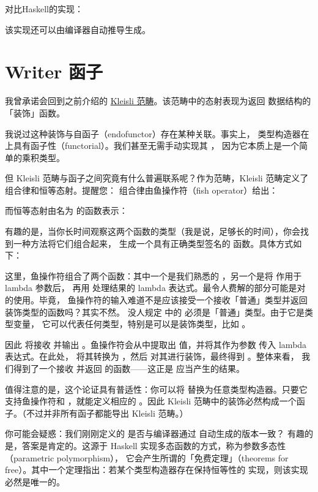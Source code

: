 对比Haskell的实现：

该实现还可以由编译器自动推导生成。

\section{Writer 函子}

我曾承诺会回到之前介绍的 \hyperref[kleisli-categories]{Kleisli
  范畴}。该范畴中的态射表现为返回 
数据结构的「装饰」函数。

我说过这种装饰与自函子（endofunctor）存在某种关联。事实上，
 类型构造器在  上具有函子性（functorial）。我们甚至无需手动实现其 ，
因为它本质上是一个简单的乘积类型。

但 Kleisli 范畴与函子之间究竟有什么普遍联系呢？作为范畴，Kleisli 范畴定义了组合律和恒等态射。提醒您：
组合律由鱼操作符（fish operator）给出：

而恒等态射由名为  的函数表示：

有趣的是，当你长时间观察这两个函数的类型（我是说，足够长的时间），你会找到一种方法将它们组合起来，
生成一个具有正确类型签名的  函数。具体方式如下：

这里，鱼操作符组合了两个函数：其中一个是我们熟悉的 ，另一个是将  作用于 lambda 参数后，
再用  处理结果的 lambda 表达式。最令人费解的部分可能是对  的使用。毕竟，
鱼操作符的输入难道不是应该接受一个接收「普通」类型并返回装饰类型的函数吗？其实不然。
没人规定  中的  必须是「普通」类型。由于它是类型变量，
它可以代表任何类型，特别是可以是装饰类型，比如 。

因此  将接收  并输出 。鱼操作符会从中提取出
 值，并将其作为参数  传入 lambda 表达式。在此处， 将其转换为
，然后  对其进行装饰，最终得到 。整体来看，
我们得到了一个接收  并返回  的函数——这正是 
应当产生的结果。

值得注意的是，这个论证具有普适性：你可以将  替换为任意类型构造器。只要它支持鱼操作符和
，就能定义相应的 。因此 Kleisli 范畴中的装饰必然构成一个函子。（不过并非所有函子都能导出 Kleisli 范畴。）

你可能会疑惑：我们刚刚定义的  是否与编译器通过  自动生成的版本一致？
有趣的是，答案是肯定的。这源于 Haskell 实现多态函数的方式，称为参数多态性（parametric polymorphism），
它会产生所谓的「免费定理」（theorems for free）。其中一个定理指出：若某个类型构造器存在保持恒等性的
 实现，则该实现必然是唯一的。

